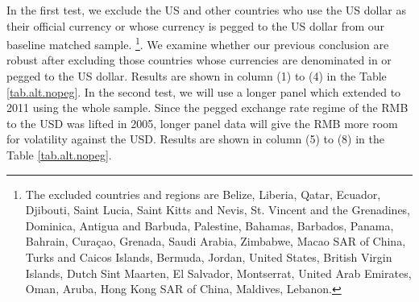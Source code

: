 \documentclass[12pt]{article}
\begin{document}
In the first test, we exclude the US and other countries who use the US dollar as their official currency or whose currency is pegged to the US dollar from our baseline matched sample. \footnote{The excluded countries and regions are Belize, Liberia, Qatar, Ecuador, Djibouti, Saint Lucia, Saint Kitts and Nevis, St. Vincent and the Grenadines, Dominica, Antigua and Barbuda, Palestine, Bahamas, Barbados, Panama, Bahrain, Curaçao, Grenada, Saudi Arabia, Zimbabwe, Macao SAR of China, Turks and Caicos Islands, Bermuda, Jordan, United States, British Virgin Islands, Dutch Sint Maarten, El Salvador, Montserrat, United Arab Emirates, Oman, Aruba, Hong Kong SAR of China, Maldives, Lebanon.}. We examine whether our previous conclusion are robust after excluding those countries whose currencies are denominated in or pegged to the US dollar. Results are shown in column (1) to (4) in the Table \ref{tab.alt.nopeg}. In the second test, we will use a longer panel which extended to 2011 using the whole sample. Since the pegged exchange rate regime of the RMB to the USD was lifted in 2005, longer panel data will give the RMB more room for volatility against the USD. Results are shown in column (5) to (8) in the Table \ref{tab.alt.nopeg}.
\end{document}
